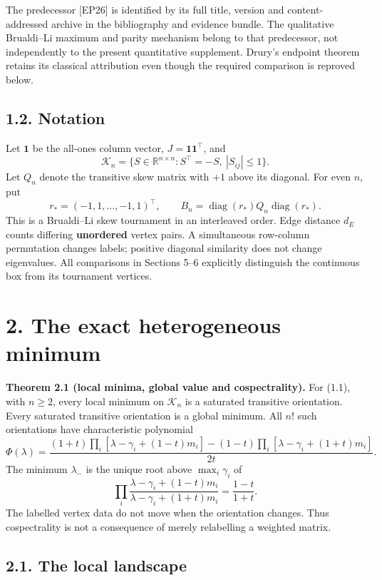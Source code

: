 \documentclass[
  11pt,
  a4paper,
]{article}
\begin{document}
The predecessor {[}EP26{]} is identified by its full title, version and
content-addressed archive in the bibliography and evidence bundle. The
qualitative Brualdi--Li maximum and parity mechanism belong to that
predecessor, not independently to the present quantitative supplement.
Drury's endpoint theorem retains its classical attribution even though
the required comparison is reproved below.

\subsection{1.2. Notation}\label{notation}

Let \(\mathbf1\) be the all-ones column vector,
\(J=\mathbf1\mathbf1^\top\), and
\[\mathcal K_n=\{S\in\mathbb R^{n\times n}:S^\top=-S,\ |S_{ij}|\le1\}.\]
Let \(Q_n\) denote the transitive skew matrix with \(+1\) above its
diagonal. For even \(n\), put
\[r_*=(-1,1,\ldots,-1,1)^\top,\qquad B_n=\operatorname{diag}(r_*)Q_n\operatorname{diag}(r_*).\]
This is a Brualdi--Li skew tournament in an interleaved order. Edge
distance \(d_E\) counts differing \textbf{unordered} vertex pairs. A
simultaneous row-column permutation changes labels; positive diagonal
similarity does not change eigenvalues. All comparisons in Sections 5--6
explicitly distinguish the continuous box from its tournament vertices.

\section{2. The exact heterogeneous
minimum}\label{the-exact-heterogeneous-minimum}

\textbf{Theorem 2.1 (local minima, global value and cospectrality).} For
(1.1), with \(n\ge2\), every local minimum on \(\mathcal K_n\) is a
saturated transitive orientation. Every saturated transitive orientation
is a global minimum. All \(n!\) such orientations have characteristic
polynomial \[
 \Phi(\lambda)=
 \frac{(1+t)\prod_i[\lambda-\gamma_i+(1-t)m_i]
       -(1-t)\prod_i[\lambda-\gamma_i+(1+t)m_i]}{2t}.           \tag{2.1}
\] The minimum \(\lambda_-\) is the unique root above \(\max_i\gamma_i\)
of \[
 \prod_i\frac{\lambda-\gamma_i+(1-t)m_i}
                  {\lambda-\gamma_i+(1+t)m_i}
       =\frac{1-t}{1+t}.                                    \tag{2.2}
\] The labelled vertex data do not move when the orientation changes.
Thus cospectrality is not a consequence of merely relabelling a weighted
matrix.

\subsection{2.1. The local landscape}\label{the-local-landscape}
\end{document}
